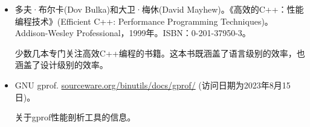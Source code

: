 \begin{itemize}
\item
多夫·布尔卡(Dov Bulka)和大卫·梅休(David Mayhew)。《高效的C++：性能编程技术》(Efficient C++: Performance Programming Techniques)。Addison-Wesley Professional，1999年。ISBN：0-201-37950-3。

\hspace*{\fill}

少数几本专门关注高效C++编程的书籍。这本书既涵盖了语言级别的效率，也涵盖了设计级别的效率。

\hspace*{\fill}

\item
GNU gprof. \url{sourceware.org/binutils/docs/gprof/} (访问日期为2023年8月15日)。

\hspace*{\fill}

关于gprof性能剖析工具的信息。
\end{itemize}